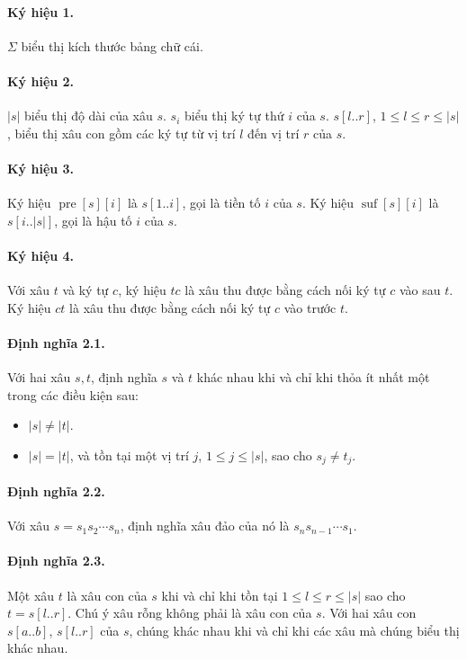 \documentclass[11pt]{article}
\begin{document}
\paragraph{Ký hiệu 1.}
\(\Sigma\) biểu thị kích thước bảng chữ cái.

\paragraph{Ký hiệu 2.}
\(|s|\) biểu thị độ dài của xâu \(s\). \(s_i\) biểu thị ký tự thứ \(i\) của
\(s\). \(s[l..r]\), \(1\le l\le r\le |s|\), biểu thị xâu con gồm các ký tự từ
vị trí \(l\) đến vị trí \(r\) của \(s\).

\paragraph{Ký hiệu 3.}
Ký hiệu \(\operatorname{pre}[s][i]\) là \(s[1..i]\), gọi là tiền tố \(i\) của
\(s\). Ký hiệu \(\operatorname{suf}[s][i]\) là \(s[i..|s|]\), gọi là hậu tố
\(i\) của \(s\).

\paragraph{Ký hiệu 4.}
Với xâu \(t\) và ký tự \(c\), ký hiệu \(tc\) là xâu thu được bằng cách nối ký
tự \(c\) vào sau \(t\). Ký hiệu \(ct\) là xâu thu được bằng cách nối ký tự
\(c\) vào trước \(t\).

\paragraph{Định nghĩa 2.1.}
Với hai xâu \(s,t\), định nghĩa \(s\) và \(t\) khác nhau khi và chỉ khi thỏa ít
nhất một trong các điều kiện sau:

\begin{itemize}
  \item \(|s|\ne |t|\).
  \item \(|s|=|t|\), và tồn tại một vị trí \(j\), \(1\le j\le |s|\), sao cho
  \(s_j\ne t_j\).
\end{itemize}

\paragraph{Định nghĩa 2.2.}
Với xâu \(s=s_1s_2\cdots s_n\), định nghĩa xâu đảo của nó là
\(s_ns_{n-1}\cdots s_1\).

\paragraph{Định nghĩa 2.3.}
Một xâu \(t\) là xâu con của \(s\) khi và chỉ khi tồn tại \(1\le l\le r\le
|s|\) sao cho \(t=s[l..r]\). Chú ý xâu rỗng không phải là xâu con của \(s\).
Với hai xâu con \(s[a..b]\), \(s[l..r]\) của \(s\), chúng khác nhau khi và chỉ
khi các xâu mà chúng biểu thị khác nhau.
\end{document}
